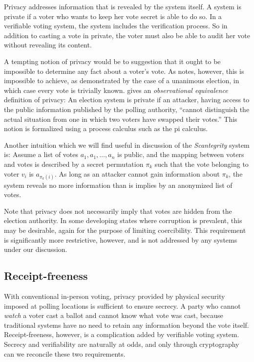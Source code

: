 \documentclass[10pt,twocolumn]{article}
\newcommand{\term}[1]{\textit{#1}}
\begin{document}
Privacy addresses information that is revealed by the system itself.
A system is private if a voter who wants to keep her vote secret is able to do so.
In a verifiable voting system, the system includes the verification process.
So in addition to casting a vote in private, the voter must also be able to
audit her vote without revealing its content.

A tempting notion of privacy would be to suggestion that it ought to be impossible
to determine any fact about a voter's vote. As \cite{preta} notes, however,
this is impossible to achieve, as demonstrated by the case of a unanimous election,
in which case every vote is trivially known.
\cite{kremer} gives an \term{observational equivalence} definition of privacy:
An election system is private if an attacker, having access to the public
information published by the polling authority, ``cannot distinguish
the actual situation from one in which two voters have swapped their votes.''
This notion is formalized using a process calculus such as the pi calculus.

Another intuition which we will find useful in discussion of the \term{Scantegrity} system is:
Assume a list of votes $a_1, a_1, \ldots, a_n$ is public, and the mapping between
voters and votes is described by a secret permutation $\pi_k$ such that the vote
belonging to voter $v_i$ is $a_{\pi_k(i)}$.
As long as an attacker cannot gain information about $\pi_k$,
the system reveals no more information than is implies by an anonymized list of votes.

Note that privacy does not necessarily imply that votes are hidden from the election
authority. In some developing states where corruption is prevalent, this may be desirable,
again for the purpose of limiting coercibility.
This requirement is significantly more restrictive, however, and is not addressed by
any systems under our discussion.

\subsection{Receipt-freeness}

With conventional in-person voting, privacy provided by physical security imposed
at polling locations is sufficient to ensure secrecy.
A party who cannot \emph{watch} a voter cast a ballot and cannot know what vote
was cast, because traditional systems have no need to retain any information
beyond the vote itself.
Receipt-freeness, however, is a complication added by verifiable voting system.
Secrecy and verifiability are naturally at odds, and only through cryptography can we
reconcile these two requirements.
\end{document}
